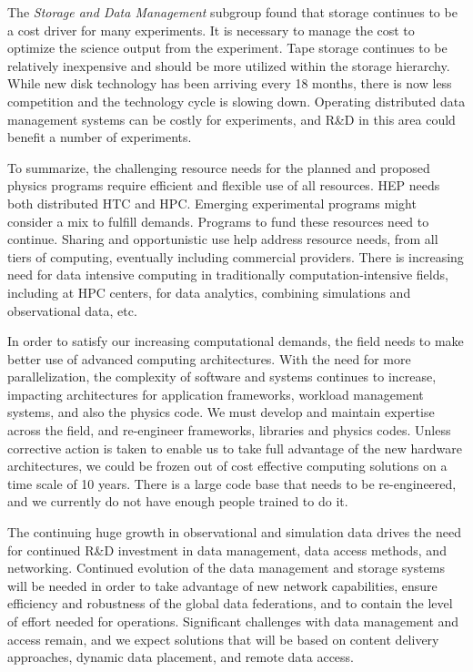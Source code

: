 The {\it Storage and Data Management} subgroup found that storage continues
to be a cost driver for many experiments. It is necessary to manage the
cost to optimize the science output from the experiment. Tape storage
continues to be relatively inexpensive and should be more utilized within
the storage hierarchy. While new disk technology has been arriving every 18
months, there is now less competition and the technology cycle is slowing
down. Operating distributed data management systems can be costly for
experiments, and R\&D in this area could benefit a number of experiments.

To summarize, the challenging resource needs for the planned and proposed
physics programs require efficient and flexible use of all resources. HEP
needs both distributed HTC and HPC. Emerging experimental programs might
consider a mix to fulfill demands. Programs to fund these resources need to
continue. Sharing and opportunistic use help address resource needs, from
all tiers of computing, eventually including commercial providers. There is
increasing need for data intensive computing in traditionally
computation-intensive fields, including at HPC centers, for data analytics,
combining simulations and observational data, etc.

In order to satisfy our increasing computational demands, the field needs
to make better use of advanced computing architectures. With the need for
more parallelization, the complexity of software and systems continues to
increase, impacting architectures for application frameworks, workload
management systems, and also the physics code. We must develop and maintain
expertise across the field, and re-engineer frameworks, libraries and
physics codes. Unless corrective action is taken to enable us to take full
advantage of the new hardware architectures, we could be frozen out of cost
effective computing solutions on a time scale of 10 years. There is a large
code base that needs to be re-engineered, and we currently do not have
enough people trained to do it.

The continuing huge growth in observational and simulation data drives the
need for continued R\&D investment in data management, data access methods,
and networking. Continued evolution of the data management and storage
systems will be needed in order to take advantage of new network
capabilities, ensure efficiency and robustness of the global data
federations, and to contain the level of effort needed for operations.
Significant challenges with data management and access remain, and we
expect solutions that will be based on content delivery approaches, dynamic
data placement, and remote data access.

